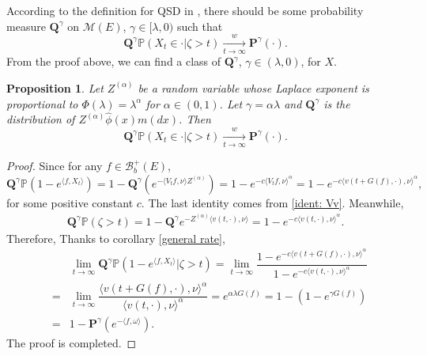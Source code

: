 \documentclass[12pt,a4paper]{amsart}
\theoremstyle{plain}
\newtheorem{prop}[thm]{Proposition}
\theoremstyle{definition}
\numberwithin{equation}{section}
\begin{document}
{\color{blue}According to the definition for QSD in \cite{ChampagnatVillemonais2018Convergence}, there should be some probability measure $\mathbf Q^\gamma$ on $\mathcal M(E)$, $\gamma\in[\lambda, 0)$ such that
\[
 \mathbf Q^{\gamma}\mathbb P(X_t \in \cdot | \zeta > t) \xrightarrow[t\to \infty]{w} {\mathbf P^\gamma}(\cdot).
\]
From the proof above, we can find a class of $\mathbf Q^\gamma$, $\gamma\in (\lambda, 0)$, for $X$.
\begin{prop}
Let $Z^{(\alpha)}$ be a random variable whose Laplace exponent is proportional to $\Phi(\lambda)=\lambda^{\alpha}$ for $\alpha\in(0,1)$.  Let $\gamma=\alpha\lambda$ and $\mathbf Q^{\gamma}$ is the distribution of $Z^{(\alpha)}\hat\phi(x)m(dx)$.  Then
\[
 \mathbf Q^{\gamma}\mathbb P(X_t \in \cdot | \zeta > t) \xrightarrow[t\to \infty]{w} {\mathbf P^\gamma}(\cdot).
\]
\end{prop}
\begin{proof}
Since for any $f\in\mathcal B_b^+(E)$,
\[
\mathbf Q^{\gamma}\mathbb P\left(1-e^{\langle f, X_t\rangle }\right)=1-\mathbf Q^{\gamma}\left(e^{-\langle V_tf,\nu\rangle Z^{(\alpha)}}\right)
=1-e^{-c\langle V_tf,\nu\rangle^\alpha}=1-e^{-c\langle v(t+G(f),\cdot),\nu\rangle^\alpha},
\]
for some positive constant $c$. The last identity comes from \eqref{ident: Vv}.  Meanwhile,
\begin{eqnarray*}
\mathbf Q^{\gamma}\mathbb P(\zeta>t)=1-\mathbf Q^{\gamma}e^{-Z^{(\alpha)}\langle v(t,\cdot),\nu\rangle }=1-e^{-c\langle v(t,\cdot),\nu\rangle^\alpha}.
\end{eqnarray*}
Therefore, Thanks to corollary \ref{general rate},
\begin{eqnarray*}
&&\lim_{t\to\infty}\mathbf Q^{\gamma}\mathbb P\left(1-e^{\langle f, X_t\rangle }\big|\zeta>t\right)=\lim_{t\to\infty}\dfrac{1-e^{-c\langle v(t+G(f),\cdot),\nu\rangle^\alpha}}{1-e^{-c\langle v(t,\cdot),\nu\rangle^\alpha}}\\
&=&\lim_{t\to\infty}\dfrac{\langle v(t+G(f),\cdot),\nu\rangle^\alpha}{\langle v(t,\cdot),\nu\rangle^\alpha}= e^{\alpha\lambda G(f)}=1-(1-e^{\gamma G(f)})\\
&=&1-\mathbf P^{\gamma}(e^{-\langle f,\omega\rangle}).
\end{eqnarray*}
The proof is completed.
\end{proof}
}
\end{document}
